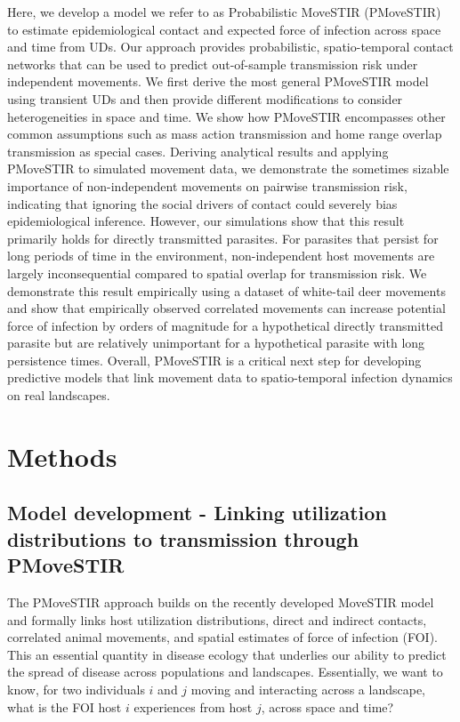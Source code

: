 \documentclass[letterpaper]{article}
\begin{document}
Here, we develop a model we refer to as Probabilistic MoveSTIR (PMoveSTIR) to estimate epidemiological contact and expected force of infection across space and time from UDs. Our approach provides probabilistic, spatio-temporal contact networks that can be used to predict out-of-sample transmission risk under independent movements. We first derive the most general PMoveSTIR model using transient UDs and then provide different modifications to consider heterogeneities in space and time. We  show how PMoveSTIR encompasses other common assumptions such as mass action transmission and home range overlap transmission as special cases. Deriving analytical results and applying PMoveSTIR to simulated movement data, we demonstrate the sometimes sizable importance of non-independent movements on pairwise transmission risk, indicating that ignoring the social drivers of contact could severely bias epidemiological inference. However, our simulations show that this result primarily holds for directly transmitted parasites. For parasites that persist for long periods of time in the environment, non-independent host movements are largely inconsequential compared to spatial overlap for transmission risk. We demonstrate this result empirically using a dataset of white-tail deer movements and show that empirically observed correlated movements can increase potential force of infection by orders of magnitude for a hypothetical directly transmitted parasite but are relatively unimportant for a hypothetical parasite with long persistence times.  Overall, PMoveSTIR is a critical next step for developing predictive models that link movement data to spatio-temporal infection dynamics on real landscapes.

\section*{Methods}

\subsection*{Model development - Linking utilization distributions to transmission through PMoveSTIR}

The PMoveSTIR approach builds on the recently developed MoveSTIR model \citep{Wilber2022} and formally links host utilization distributions, direct and indirect contacts, correlated animal movements, and spatial estimates of force of infection (FOI). This an essential quantity in disease ecology that underlies our ability to predict the spread of disease across populations and landscapes. Essentially, we want to know, for two individuals $i$ and $j$ moving and interacting across a landscape, what is the FOI host $i$ experiences from host $j$, across space and time?  
\end{document}
